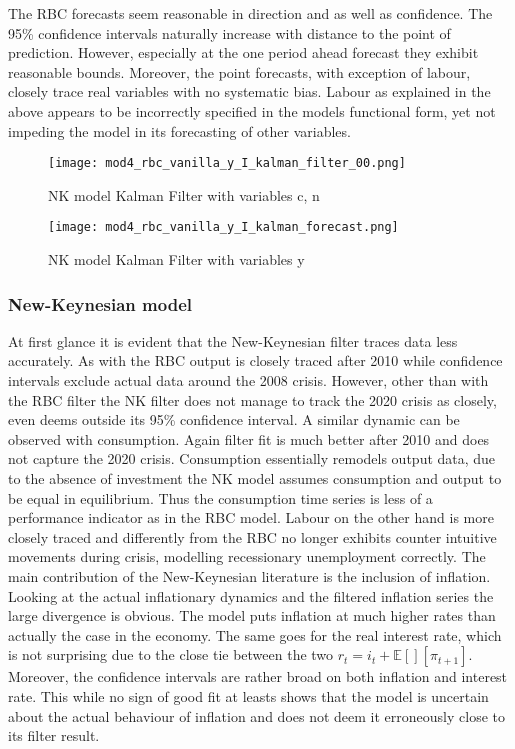 \documentclass[12pt,a4paper,english]{article} %
\newcommand{\E}{\mathbb{E}} %
\begin{document}
	The RBC forecasts seem reasonable in direction and as well as confidence. The 95\% confidence intervals naturally increase with distance to the point of prediction. However, especially at the one period ahead forecast they exhibit reasonable bounds. Moreover, the point forecasts, with exception of labour, closely trace real variables with no systematic bias. Labour as explained in the above appears to be incorrectly specified in the models functional form, yet not impeding the model in its forecasting of other variables. 
	\begin{figure}[H]
		\begin{center}
			\texttt{[image: mod4\_rbc\_vanilla\_y\_I\_kalman\_filter\_00.png]}
			\caption{NK model Kalman Filter with variables c, n}\label{fig:rbc_kfil}
			
			\texttt{[image: mod4\_rbc\_vanilla\_y\_I\_kalman\_forecast.png]}
			\caption{NK model Kalman Filter with variables y}\label{fig:rbc_kfor}
		\end{center}
	\end{figure}
	
	\subsubsection{New-Keynesian model}
	At first glance it is evident that the New-Keynesian filter traces data less accurately. As with the RBC output is closely traced after 2010 while confidence intervals exclude actual data around the 2008 crisis. However, other than with the RBC filter the NK filter does not manage to track the 2020 crisis as closely, even deems outside its 95\% confidence interval.
	A similar dynamic can be observed with consumption. Again filter fit is much better after 2010 and does not capture the 2020 crisis. Consumption essentially remodels output data, due to the absence of investment the NK model assumes consumption and output to be equal in equilibrium. Thus the consumption time series is less of a performance indicator as in the RBC model.
	Labour on the other hand is more closely traced and differently from the RBC no longer exhibits counter intuitive movements during crisis, modelling recessionary unemployment correctly. 
	The main contribution of the New-Keynesian literature is the inclusion of inflation. Looking at the actual inflationary dynamics and the filtered inflation series the large divergence is obvious. The model puts inflation at much higher rates than actually the case in the economy. The same goes for the real interest rate, which is not surprising due to the close tie between the two $r_t = i_t + \E[][\pi_{t+1}]$. Moreover, the confidence intervals are rather broad on both inflation and interest rate. This while no sign of good fit at leasts shows that the model is uncertain about the actual behaviour of inflation and does not deem it erroneously close to its filter result.
	
\end{document}
